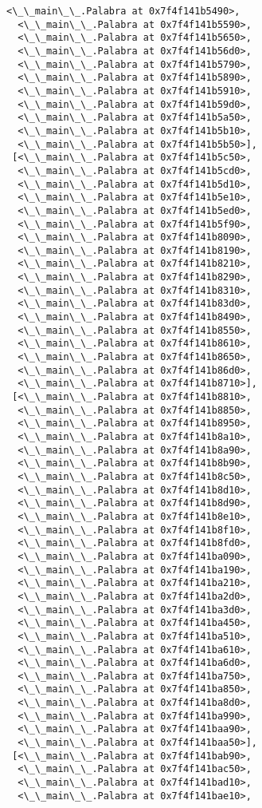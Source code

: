 \documentclass[12pt,a4paper,table]{article}
\begin{document}
\begin{tcolorbox}[breakable, size=fbox, boxrule=.5pt, pad at break*=1mm, opacityfill=0]
\begin{Verbatim}[commandchars=\\\{\}]
  <\_\_main\_\_.Palabra at 0x7f4f141b5490>,
  <\_\_main\_\_.Palabra at 0x7f4f141b5590>,
  <\_\_main\_\_.Palabra at 0x7f4f141b5650>,
  <\_\_main\_\_.Palabra at 0x7f4f141b56d0>,
  <\_\_main\_\_.Palabra at 0x7f4f141b5790>,
  <\_\_main\_\_.Palabra at 0x7f4f141b5890>,
  <\_\_main\_\_.Palabra at 0x7f4f141b5910>,
  <\_\_main\_\_.Palabra at 0x7f4f141b59d0>,
  <\_\_main\_\_.Palabra at 0x7f4f141b5a50>,
  <\_\_main\_\_.Palabra at 0x7f4f141b5b10>,
  <\_\_main\_\_.Palabra at 0x7f4f141b5b50>],
 [<\_\_main\_\_.Palabra at 0x7f4f141b5c50>,
  <\_\_main\_\_.Palabra at 0x7f4f141b5cd0>,
  <\_\_main\_\_.Palabra at 0x7f4f141b5d10>,
  <\_\_main\_\_.Palabra at 0x7f4f141b5e10>,
  <\_\_main\_\_.Palabra at 0x7f4f141b5ed0>,
  <\_\_main\_\_.Palabra at 0x7f4f141b5f90>,
  <\_\_main\_\_.Palabra at 0x7f4f141b8090>,
  <\_\_main\_\_.Palabra at 0x7f4f141b8190>,
  <\_\_main\_\_.Palabra at 0x7f4f141b8210>,
  <\_\_main\_\_.Palabra at 0x7f4f141b8290>,
  <\_\_main\_\_.Palabra at 0x7f4f141b8310>,
  <\_\_main\_\_.Palabra at 0x7f4f141b83d0>,
  <\_\_main\_\_.Palabra at 0x7f4f141b8490>,
  <\_\_main\_\_.Palabra at 0x7f4f141b8550>,
  <\_\_main\_\_.Palabra at 0x7f4f141b8610>,
  <\_\_main\_\_.Palabra at 0x7f4f141b8650>,
  <\_\_main\_\_.Palabra at 0x7f4f141b86d0>,
  <\_\_main\_\_.Palabra at 0x7f4f141b8710>],
 [<\_\_main\_\_.Palabra at 0x7f4f141b8810>,
  <\_\_main\_\_.Palabra at 0x7f4f141b8850>,
  <\_\_main\_\_.Palabra at 0x7f4f141b8950>,
  <\_\_main\_\_.Palabra at 0x7f4f141b8a10>,
  <\_\_main\_\_.Palabra at 0x7f4f141b8a90>,
  <\_\_main\_\_.Palabra at 0x7f4f141b8b90>,
  <\_\_main\_\_.Palabra at 0x7f4f141b8c50>,
  <\_\_main\_\_.Palabra at 0x7f4f141b8d10>,
  <\_\_main\_\_.Palabra at 0x7f4f141b8d90>,
  <\_\_main\_\_.Palabra at 0x7f4f141b8e10>,
  <\_\_main\_\_.Palabra at 0x7f4f141b8f10>,
  <\_\_main\_\_.Palabra at 0x7f4f141b8fd0>,
  <\_\_main\_\_.Palabra at 0x7f4f141ba090>,
  <\_\_main\_\_.Palabra at 0x7f4f141ba190>,
  <\_\_main\_\_.Palabra at 0x7f4f141ba210>,
  <\_\_main\_\_.Palabra at 0x7f4f141ba2d0>,
  <\_\_main\_\_.Palabra at 0x7f4f141ba3d0>,
  <\_\_main\_\_.Palabra at 0x7f4f141ba450>,
  <\_\_main\_\_.Palabra at 0x7f4f141ba510>,
  <\_\_main\_\_.Palabra at 0x7f4f141ba610>,
  <\_\_main\_\_.Palabra at 0x7f4f141ba6d0>,
  <\_\_main\_\_.Palabra at 0x7f4f141ba750>,
  <\_\_main\_\_.Palabra at 0x7f4f141ba850>,
  <\_\_main\_\_.Palabra at 0x7f4f141ba8d0>,
  <\_\_main\_\_.Palabra at 0x7f4f141ba990>,
  <\_\_main\_\_.Palabra at 0x7f4f141baa90>,
  <\_\_main\_\_.Palabra at 0x7f4f141baa50>],
 [<\_\_main\_\_.Palabra at 0x7f4f141bab90>,
  <\_\_main\_\_.Palabra at 0x7f4f141bac50>,
  <\_\_main\_\_.Palabra at 0x7f4f141bad10>,
  <\_\_main\_\_.Palabra at 0x7f4f141bae10>,

\end{Verbatim}
\end{tcolorbox}
\end{document}
